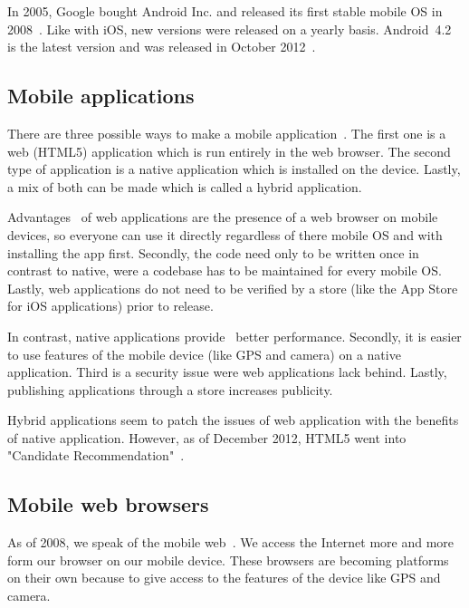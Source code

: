 \documentclass[a4paper]{artikel3}
\renewcommand{\paragraph}[1]{\vspace{2mm} \noindent {\bf #1}  }
\begin{document}
\paragraph{Android}
In 2005, Google bought Android Inc. and released its first stable mobile OS in 2008~\cite{Satyesh2012}.
Like with iOS, new versions were released on a yearly basis.
Android~4.2 is the latest version and was released in October 2012~\cite{Sawers2012}.

\subsection{Mobile applications}
There are three possible ways to make a mobile application~\cite{Accenture2012,Hales2012}.
The first one is a web (HTML5) application which is run entirely in the web browser.
The second type of application is a native application which is installed on the device.
Lastly, a mix of both can be made which is called a hybrid application.

Advantages~\cite{Accenture2012} of web applications are the presence of a web browser on mobile devices, so everyone can use it directly regardless of there mobile OS and with installing the app first.
Secondly, the code need only to be written once in contrast to native, were a codebase has to be maintained for every mobile OS.
Lastly, web applications do not need to be verified by a store (like the App Store for iOS applications) prior to release.

In contrast, native applications provide~\cite{Accenture2012} better performance.
Secondly, it is easier to use features of the mobile device (like GPS and camera) on a native application.
Third is a security issue were web applications lack behind.
Lastly, publishing applications through a store increases publicity.

Hybrid applications seem to patch the issues of web application with the benefits of native application.
However, as of December 2012, HTML5 went into "Candidate Recommendation"~\cite{Jacobs2012}.

\subsection{Mobile web browsers}
As of 2008, we speak of the mobile web~\cite{Hales2012}.
We access the Internet more and more form our browser on our mobile device.
These browsers are becoming platforms on their own because to give access to the features of the device like GPS and camera. 
\end{document}
